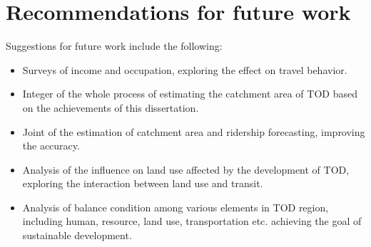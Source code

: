 \section{Recommendations for future work}
Suggestions for future work include the following:

\begin{itemize}
	\item Surveys of income and occupation, exploring the effect on travel behavior.
	
	\item Integer of the whole process of estimating the catchment area of TOD based on the achievements of this dissertation.
	
	\item Joint of the estimation of catchment area and ridership forecasting, improving the accuracy.
	
	\item Analysis of the influence on land use affected by the development of TOD, exploring the interaction between land use and transit.
	
	\item Analysis of balance condition among various elements in TOD region, including human, resource, land use, transportation etc. achieving the goal of sustainable development.
\end{itemize}

\clearpage